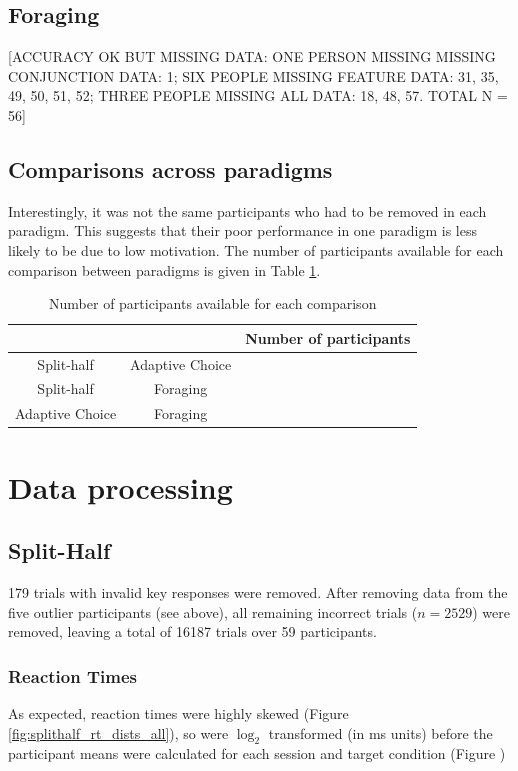 \documentclass[a4paper, oneside, 11pt, onecolumn]{article}
\begin{document}
\subsection{Foraging}

[ACCURACY OK BUT MISSING DATA: ONE PERSON MISSING MISSING CONJUNCTION DATA: 1; SIX PEOPLE MISSING FEATURE DATA: 31, 35, 49, 50, 51, 52; THREE PEOPLE MISSING ALL DATA: 18, 48, 57. TOTAL N = 56]

\subsection{Comparisons across paradigms}

Interestingly, it was not the same participants who had to be removed in each paradigm. This suggests that their poor performance in one paradigm is less likely to be due to low motivation. The number of participants available for each comparison between paradigms is given in Table \ref{tab:num_per_paradigm}.

\begin{table}
\centering
\small
\begin{tabular}{cc|c}
 			&					& Number of participants\\
\hline
Split-half 	& Adaptive Choice 	& \\
Split-half 	& Foraging 			& \\
Adaptive Choice & Foraging 		& \\
\end{tabular}
\caption{Number of participants available for each comparison}
\label{tab:num_per_paradigm}
\end{table}

\section{Data processing}

\subsection{Split-Half}

179 trials with invalid key responses were removed. After removing data from the five outlier participants (see above), all remaining incorrect trials ($n=2529$) were removed, leaving a total of 16187 trials over 59 participants.

\subsubsection{Reaction Times}
As expected, reaction times were highly skewed (Figure \ref{fig:splithalf_rt_dists_all}), so were $\log_2$ transformed (in ms units) before the participant means were calculated for each session and target condition (Figure )
\end{document}
